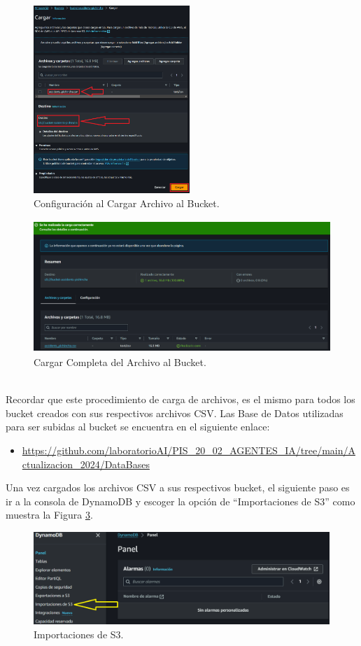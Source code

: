 \documentclass[a4paper,10pt, oneside, titlepage]{article}
\begin{document}
	\begin{figure}[!h]
		\centering
		\includegraphics[width = 1\linewidth, height = 7.1cm]{Archivo_Destino_Bucket_S3.png}
		\caption{Configuración al Cargar Archivo al Bucket.}
		\label{Archivo_Destino_Bucket_S3}
	\end{figure}
	\begin{figure}[!h]
		\centering
		\includegraphics[width = 1\linewidth, height = 5cm]{Carga_Completa_Archivo_Bucket.png}
		\caption{Cargar Completa del Archivo al Bucket.}
		\label{Carga_Completa_Archivo_Bucket}
	\end{figure} \\
	\indent Recordar que este procedimiento de carga de archivos, es el mismo para todos los bucket creados con sus respectivos archivos CSV. Las Base de Datos utilizadas para ser subidas al bucket se encuentra en el siguiente enlace:
	\begin{itemize}
		\item \textcolor{blue}{\url{https://github.com/laboratorioAI/PIS_20_02_AGENTES_IA/tree/main/Actualizacion_2024/DataBases}}
	\end{itemize}
	\indent Una vez cargados los archivos CSV a sus respectivos bucket, el siguiente paso es ir a la consola de DynamoDB y escoger la opción de ``Importaciones de S3'' como muestra la Figura \ref{Importaciones_S3_Bucket}.
	\begin{figure}[!h]
		\centering
		\includegraphics[width = 1\linewidth, height = 3.5cm]{Importaciones_S3_Bucket.png}
		\caption{Importaciones de S3.}
		\label{Importaciones_S3_Bucket}
	\end{figure} \\
\end{document}
